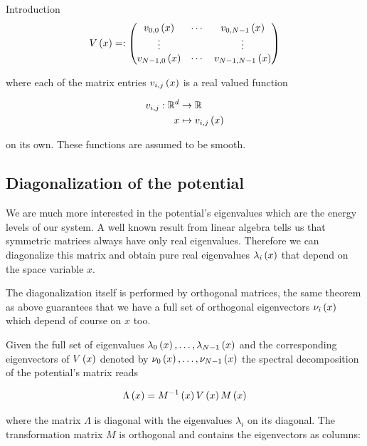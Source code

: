 \begin{chapter}{Introduction}
\begin{equation} \label{eq:general_potential_matrix}
  V\left( x \right) =:
  \begin{pmatrix}
    v_{0,0}\left( x \right) & \cdots & v_{0,N-1}\left( x \right) \\
    \vdots         &        & \vdots \\
    v_{N-1,0}\left( x \right) & \cdots & v_{N-1,N-1}\left( x \right)
  \end{pmatrix}
\end{equation}

where each of the matrix entries $v_{i,j}\left( x \right)$ is a real valued function

\begin{align*} \label{eq:matrix_potential_function_entry}
  v_{i,j} : \mathbb{R}^d & \rightarrow \mathbb{R} \\
                       x & \mapsto v_{i,j}\left( x \right)
\end{align*}

on its own. These functions are assumed to be smooth.

\subsection{Diagonalization of the potential}

We are much more interested in the potential's eigenvalues which are the energy
levels of our system. A well known result from linear algebra tells us that
symmetric matrices always have only real eigenvalues. Therefore we can diagonalize
this matrix and obtain pure real eigenvalues $\lambda_i\left( x \right)$ that depend on the
space variable $x$.

The diagonalization itself is performed by orthogonal matrices, the same theorem
as above guarantees that we have a full set of orthogonal eigenvectors $\nu_i\left( x \right)$
which depend of course on $x$ too.

Given the full set of eigenvalues $\lambda_0\left( x \right), \ldots, \lambda_{N-1}\left( x \right)$
and the corresponding eigenvectors of $V\left( x \right)$ denoted by $\nu_0\left( x \right), \ldots, \nu_{N-1}\left( x \right)$
the spectral decomposition of the potential's matrix reads

\begin{equation} \label{eq:general_spectral_transformation}
  \Lambda\left( x \right) = M^{-1}\left( x \right) V\left( x \right) M\left( x \right)
\end{equation}

where the matrix $\Lambda$ is diagonal with the eigenvalues $\lambda_i$ on its
diagonal. The transformation matrix $M$ is orthogonal and contains the
eigenvectors as columns:


\end{chapter}
